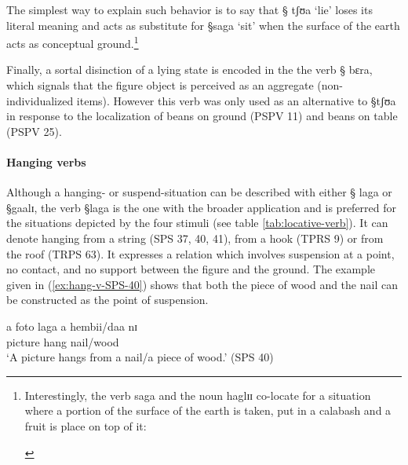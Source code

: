 The simplest way
to explain such  behavior is to say that  {\S
tʃʊa} `lie' loses its literal meaning and acts as substitute for {\S saga}
`sit' when the  surface of the earth acts as conceptual
ground.\footnote{Interestingly, the verb {\F saga} and the noun {\F haglɪɪ}
co-locate  for a situation where a portion of the surface of the earth is
taken, put in a
calabash and  a fruit is place on top of it:

\begin{exe}
\end{exe} 
}





Finally, a sortal disinction of a lying state is encoded in the the verb {\S
bɛra},  which signals that the figure object is perceived as an aggregate
(non-individualized items).  However this verb was only  used as an alternative
to
{\S tʃʊa} in response to the localization of  beans on ground (PSPV 11) and
beans on table (PSPV 25).


\paragraph{Hanging verbs}
\label{sec:SPA-hanging-v}

Although a hanging-  or suspend-situation can be described with either {\S
laga} or {\S gaalɪ}, the verb   {\S laga} is the one with the broader
application and  is preferred for the situations depicted by the four stimuli
(see table \ref{tab:locative-verb}).  It can denote hanging from a string (SPS
37, 40, 41),   from
a hook (TPRS 9) or from the roof (TRPS 63).  It expresses a relation which
involves suspension at a point, no contact,  and no
support between the figure and the ground.
The example given in (\ref{ex:hang-v-SPS-40}) shows that both the piece of wood
and the nail can be constructed as the point of suspension. 



\begin{exe}
\ex\label{ex:hang-v-SPS-40}
 \begin{xlist}
  \ex\label{ex:}
\gll a foto laga a hembii/daa nɪ \\
  {\art} picture hang   {\art} nail/wood  {\postp} \\
\glt `A picture hangs from a nail/a piece of wood.'  (SPS 40)

 \end{xlist}
\end{exe}

